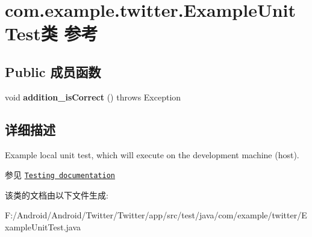 \hypertarget{classcom_1_1example_1_1twitter_1_1_example_unit_test}{}\section{com.\+example.\+twitter.\+Example\+Unit\+Test类 参考}
\label{classcom_1_1example_1_1twitter_1_1_example_unit_test}
\subsection*{Public 成员函数}
\begin{DoxyCompactItemize}
\item 
\mbox{\label{classcom_1_1example_1_1twitter_1_1_example_unit_test_af03c38f7d73567118abe6616bf39ff3b}} 
void {\bfseries addition\+\_\+is\+Correct} ()  throws Exception 
\end{DoxyCompactItemize}


\subsection{详细描述}
Example local unit test, which will execute on the development machine (host).

\begin{DoxySeeAlso}{参见}
\href{http://d.android.com/tools/testing}{\tt Testing documentation} 
\end{DoxySeeAlso}


该类的文档由以下文件生成\+:\begin{DoxyCompactItemize}
\item 
F\+:/\+Android/\+Android/\+Twitter/\+Twitter/app/src/test/java/com/example/twitter/Example\+Unit\+Test.\+java\end{DoxyCompactItemize}
